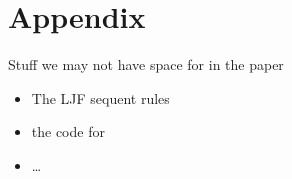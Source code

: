 
\section{Appendix}
\label{sec:app}

Stuff we may not have space for in the paper
\begin{itemize}
\item The LJF sequent rules
\item the code for
  
\item \dots
\end{itemize}

